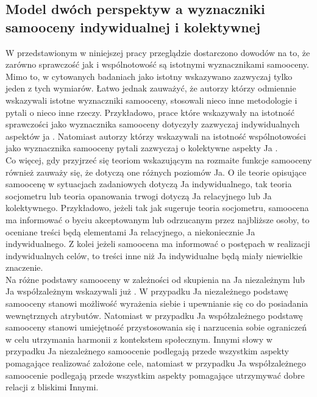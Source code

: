 \documentclass[man]{apa6}
\begin{document}
\newpage
\subsection{Model dwóch perspektyw a wyznaczniki samooceny indywidualnej i kolektywnej}

W przedstawionym w niniejszej pracy przeglądzie dostarczono dowodów na to, że zarówno sprawczość jak i wspólnotowość są istotnymi wyznacznikami samooceny. Mimo to, w cytowanych badaniach jako istotny wskazywano zazwyczaj tylko jeden z tych wymiarów. Łatwo jednak zauważyć, że autorzy którzy odmiennie wskazywali istotne wyznaczniki samooceny, stosowali nieco inne metodologie i pytali o nieco inne rzeczy. Przykładowo, prace które wskazywały na istotność sprawczości jako wyznacznika samooceny dotyczyły zazwyczaj indywidualnych aspektów ja \parencite[np., ][]{wojciszke2011self}. Natomiast autorzy którzy wskazywali na istotność wspólnotowości jako wyznacznika samooceny pytali zazwyczaj o kolektywne aspekty Ja \parencite[np., ][]{leach2007group, ellemers2008better}. \\

Co więcej, gdy przyjrzeć się teoriom wskazującym na rozmaite funkcje samooceny również zauważy się, że dotyczą one różnych poziomów Ja. O ile teorie opisujące samoocenę w sytuacjach zadaniowych \parencite[np., ][]{bandura1994self} dotyczą Ja indywidualnego, tak teoria socjometru \parencite{leary1995self} lub teoria opanowania trwogi \parencite{pyszczynski2004people} dotyczą Ja relacyjnego lub Ja kolektywnego. Przykładowo, jeżeli tak jak sugeruje teoria socjometru, samoocena ma informować o byciu akceptowanym lub odrzucanym przez najbliższe osoby, to oceniane treści będą elementami Ja relacyjnego, a niekoniecznie Ja indywidualnego. Z kolei jeżeli samoocena ma informować o postępach w realizacji indywidualnych celów, to treści inne niż Ja indywidualne będą miały niewielkie znaczenie.\\

Na różne podstawy samooceny w zależności od skupienia na Ja niezależnym lub Ja współzależnym wskazywali już \textcite{markus1991culture}. W przypadku Ja niezależnego podstawę samooceny stanowi możliwość wyrażenia siebie i upewnianie się co do posiadania wewnętrznych atrybutów. Natomiast w przypadku Ja współzależnego podstawę samooceny stanowi umiejętność przystosowania się i narzucenia sobie ograniczeń w celu utrzymania harmonii z kontekstem społecznym. Innymi słowy w przypadku Ja niezależnego samoocenie podlegają przede wszystkim aspekty pomagające realizować założone cele, natomiast w przypadku Ja współzależnego samoocenie podlegają przede wszystkim aspekty pomagające utrzymywać dobre relacji z bliskimi Innymi.\\
\end{document}
